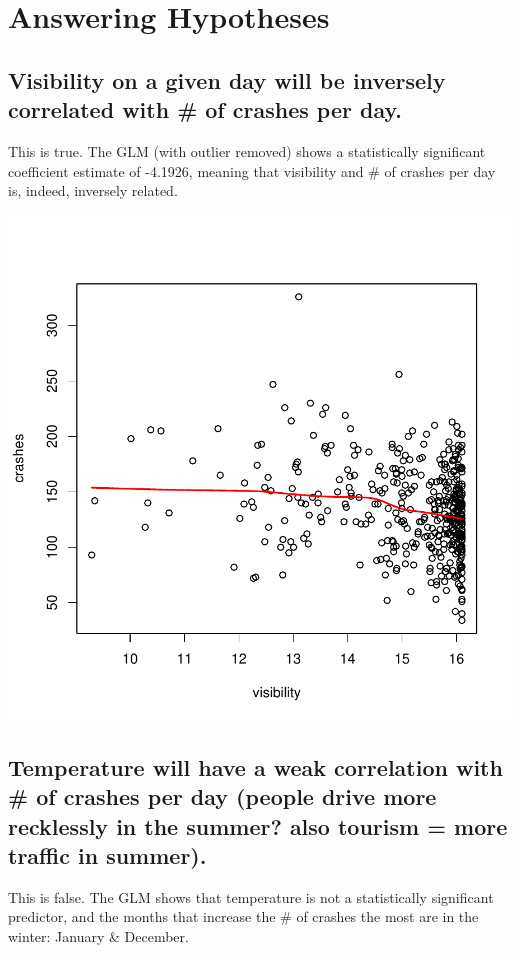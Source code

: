 \documentclass[11pt, a4paper]{article}
\begin{document}
\pagebreak
\section{Answering Hypotheses}

\subsection{Visibility on a given day will be inversely correlated with \# of crashes per day.}

This is true. The GLM (with outlier removed) shows a statistically significant coefficient estimate of -4.1926, meaning that visibility and \# of crashes per day is, indeed, inversely related. 

\includegraphics{regression-044}


\pagebreak
\subsection{Temperature will have a weak correlation with \# of crashes per day (people drive more recklessly in the summer? also tourism = more traffic in summer).}


This is false. The GLM shows that temperature is not a statistically significant predictor, and the months that increase the \# of crashes the most are in the winter: January \& December. 
\end{document}

